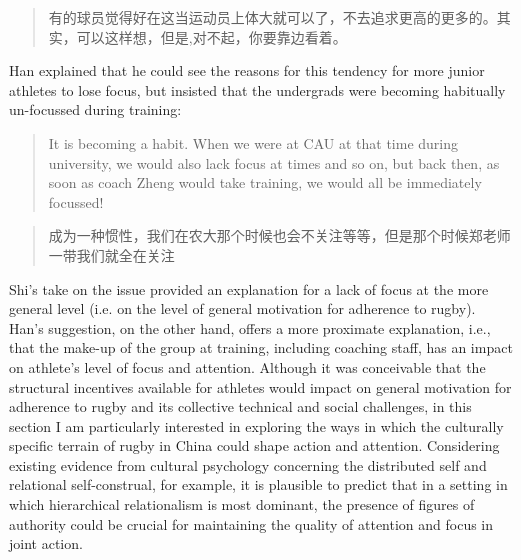 \begin{CJK}{UTF8}{gbsn}
\begin{quotation}
  有的球员觉得好在这当运动员上体大就可以了，不去追求更高的更多的。其实，可以这样想，但是,对不起，你要靠边看着。
\end{quotation}



Han explained that he could see the reasons for this tendency for more junior athletes to lose focus, but insisted that the undergrads were becoming habitually un-focussed during training:

\begin{quotation}
  It is becoming a habit.  When we were at CAU at that time during university, we would also lack focus at times and so on, but back then, as soon as coach Zheng would take training, we would all be immediately focussed!
\end{quotation}


\begin{quotation}
    成为一种惯性，我们在农大那个时候也会不关注等等，但是那个时候郑老师一带我们就全在关注
\end{quotation}



Shi's take on the issue provided an explanation for a lack of focus at the more general level (i.e. on the level of general motivation for adherence to rugby).  Han's suggestion, on the other hand, offers a more proximate explanation, i.e., that the make-up of the group at training, including coaching staff, has an impact on athlete's level of focus and attention.  Although it was conceivable that the structural incentives available for athletes would impact on general motivation for adherence to rugby and its collective technical and social challenges, in this section I am particularly interested in exploring the ways in which the culturally specific terrain of rugby in China could shape action and attention.  Considering existing evidence from cultural psychology concerning the distributed self and relational self-construal, for example, it is plausible to predict that in a setting in which hierarchical relationalism is most dominant, the presence of figures of authority could be crucial for maintaining the quality of attention and focus in joint action.



\end{CJK}
